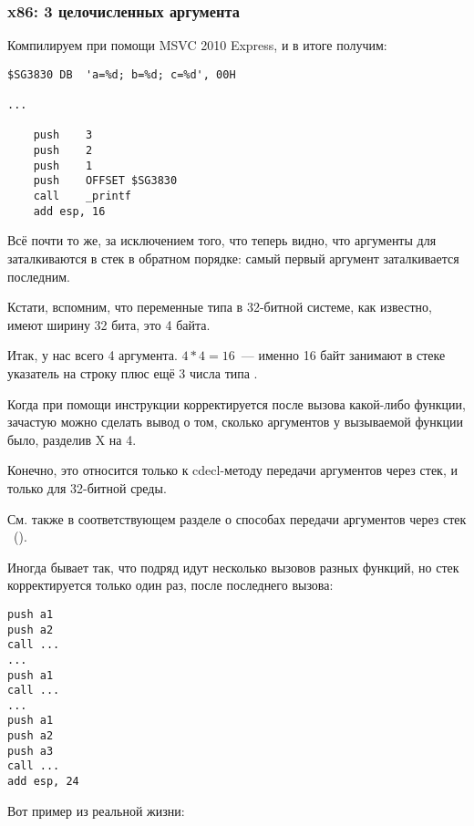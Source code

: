 \subsubsection{x86: 3 целочисленных аргумента}


Компилируем при помощи MSVC 2010 Express, и в итоге получим:

\begin{lstlisting}[style=customasmx86]
$SG3830	DB	'a=%d; b=%d; c=%d', 00H

...

	push	3
	push	2
	push	1
	push	OFFSET $SG3830
	call	_printf
	add	esp, 16
\end{lstlisting}

Всё почти то же, за исключением того, что теперь видно, что аргументы для \printf заталкиваются в стек в обратном порядке: самый первый аргумент заталкивается последним.

Кстати, вспомним, что переменные типа \Tint в 32-битной системе, как известно, имеют ширину 32 бита, это 4 байта.

Итак, у нас всего 4 аргумента. $4*4 = 16$~--- именно 16 байт занимают в стеке указатель на строку плюс ещё 3 числа типа \Tint.

Когда при помощи инструкции  корректируется  \ESP 
после вызова какой-либо функции, зачастую можно сделать вывод о том, сколько аргументов 
у вызываемой функции было, разделив X на 4.

Конечно, это относится только к cdecl-методу передачи аргументов через стек, и только для 32-битной среды.

См. также в соответствующем разделе о способах передачи аргументов через стек ~().

Иногда бывает так, что подряд идут несколько вызовов разных функций, но стек корректируется только один раз, после последнего вызова:

\begin{lstlisting}[style=customasmx86]
push a1
push a2
call ...
...
push a1
call ...
...
push a1
push a2
push a3
call ...
add esp, 24
\end{lstlisting}

Вот пример из реальной жизни:



